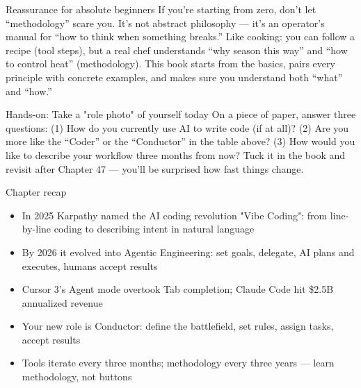 \begin{tcbinfo}{Reassurance for absolute beginners}
If you're starting from zero, don't let “methodology” scare you. It's not abstract philosophy — it's an operator's manual for “how to think when something breaks.” Like cooking: you can follow a recipe (tool steps), but a real chef understands “why season this way” and “how to control heat” (methodology). This book starts from the basics, pairs every principle with concrete examples, and makes sure you understand both “what” and “how.”

\end{tcbinfo}

\begin{tcbpractice}{Hands-on: Take a "role photo" of yourself today}
On a piece of paper, answer three questions: (1) How do you currently use AI to write code (if at all)? (2) Are you more like the “Coder” or the “Conductor” in the table above? (3) How would you like to describe your workflow three months from now? Tuck it in the book and revisit after Chapter 47 — you'll be surprised how fast things change.

\end{tcbpractice}

\begin{tcbsummary}{Chapter recap}
\begin{itemize}
  \item In 2025 Karpathy named the AI coding revolution "Vibe Coding": from line-by-line coding to describing intent in natural language
  \item By 2026 it evolved into Agentic Engineering: set goals, delegate, AI plans and executes, humans accept results
  \item Cursor 3's Agent mode overtook Tab completion; Claude Code hit \$2.5B annualized revenue
  \item Your new role is Conductor: define the battlefield, set rules, assign tasks, accept results
  \item Tools iterate every three months; methodology every three years — learn methodology, not buttons
\end{itemize}

\end{tcbsummary}
